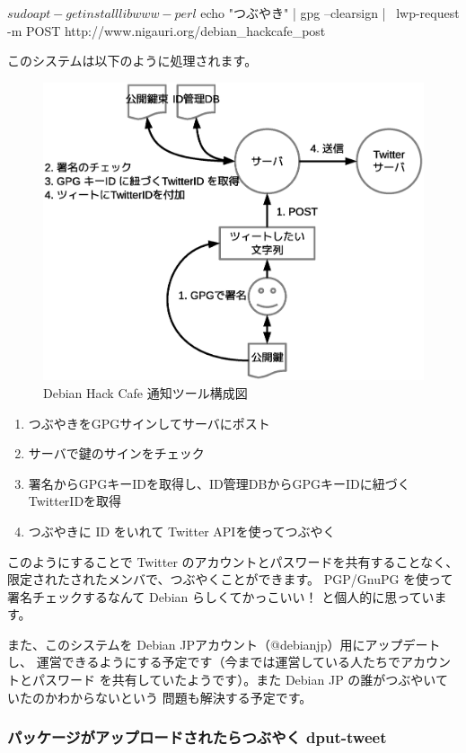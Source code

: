 \documentclass[mingoth,a4paper]{jsarticle}
\begin{document}
\begin{commandline}
$ sudo apt-get install libwww-perl
$ echo "つぶやき" | gpg --clearsign | \
  lwp-request -m POST http://www.nigauri.org/debian_hackcafe_post
\end{commandline}

このシステムは以下のように処理されます。

\begin{figure}[h]
\begin{center}
\includegraphics[width=0.7\hsize]{image201201/debianmeeting201201-imagedata-twgw.eps}
\caption{Debian Hack Cafe 通知ツール構成図}
\label{fig:debian-kernel-team}
\end{center}
\end{figure}

\begin{enumerate}
\item つぶやきをGPGサインしてサーバにポスト
\item サーバで鍵のサインをチェック
\item 署名からGPGキーIDを取得し、ID管理DBからGPGキーIDに紐づくTwitterIDを取得
\item つぶやきに ID をいれて Twitter APIを使ってつぶやく
\end{enumerate}

このようにすることで Twitter のアカウントとパスワードを共有することなく、
限定されたされたメンバで、つぶやくことができます。
PGP/GnuPG を使って署名チェックするなんて Debian らしくてかっこいい！
と個人的に思っています。

また、このシステムを Debian JPアカウント（@debianjp）用にアップデートし、
運営できるようにする予定です（今までは運営している人たちでアカウントとパスワード
を共有していたようです）。また Debian JP の誰がつぶやいていたのかわからないという
問題も解決する予定です。

\subsubsection{パッケージがアップロードされたらつぶやく dput-tweet}
\end{document}
